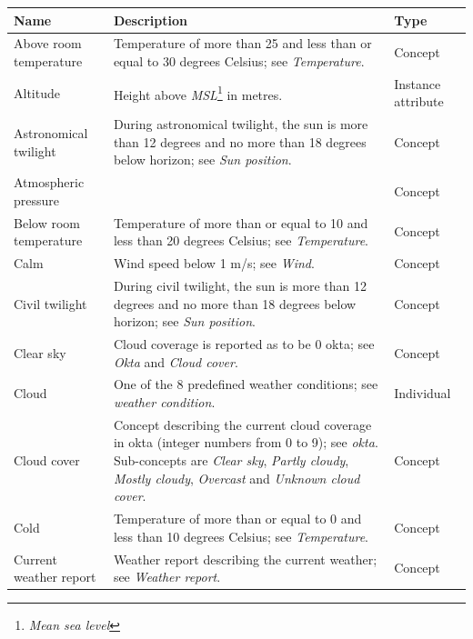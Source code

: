 \begin{longtable}{|p{}|p{}|p{}|}
  \hline
  \textbf{Name} & \textbf{Description} & \textbf{Type} \\
  \hline\hline
  Above room temperature & Temperature of more than 25 and less than or equal to 30 degrees Celsius; see \emph{Temperature}. & Concept \\
  \hline
  Altitude & Height above \emph{MSL}\footnote{\emph{Mean sea level}} in metres. & Instance attribute \\ %
  \hline
  Astronomical twilight & During astronomical twilight, the sun is more than 12 degrees and no more than 18 degrees below horizon; see \emph{Sun position}. & Concept \\ %
  \hline
  Atmospheric pressure & & Concept \\ %
  \hline
  Below room temperature & Temperature of more than or equal to 10 and less than 20 degrees Celsius; see \emph{Temperature}. & Concept \\
  \hline
  Calm & Wind speed below 1 m/s; see \emph{Wind}. & Concept \\
  \hline
  Civil twilight & During civil twilight, the sun is more than 12 degrees and no more than 18 degrees below horizon; see \emph{Sun position}. & Concept \\
  \hline
  Clear sky & Cloud coverage is reported as to be 0 okta; see \emph{Okta} and \emph{Cloud cover}. & Concept \\
  \hline
  Cloud & One of the 8 predefined weather conditions; see \emph{weather condition}. & Individual \\
  \hline
  Cloud cover & Concept describing the current cloud coverage in okta (integer numbers from 0 to 9); see \emph{okta}. Sub-concepts are \emph{Clear sky}, \emph{Partly cloudy}, \emph{Mostly cloudy}, \emph{Overcast} and \emph{Unknown cloud cover}. & Concept \\
  \hline
  Cold & Temperature of more than or equal to 0 and less than 10 degrees Celsius; see \emph{Temperature}. & Concept \\
  \hline
  Current weather report & Weather report describing the current weather; see \emph{Weather report}. & Concept \\

\end{longtable}
